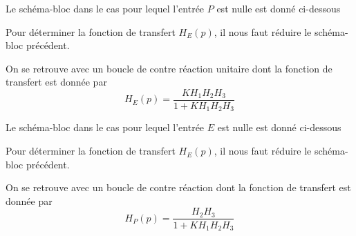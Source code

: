 
\question{}
Le schéma-bloc dans le cas pour lequel l'entrée $P$ est nulle est donné 
ci-dessous
\begin{center}
    
\end{center}

\question{}
Pour déterminer la fonction de transfert $H_E(p)$, il nous faut réduire le
schéma-bloc précédent.
\begin{center}
    
\end{center}
On se retrouve avec un boucle de contre réaction unitaire dont la fonction
de transfert est donnée par 
\[
    H_E(p)=\dfrac{KH_1H_2H_3}{1+KH_1H_2H_3}
\]

\question{}
Le schéma-bloc dans le cas pour lequel l'entrée $E$ est nulle est donné 
ci-dessous
\begin{center}
    
\end{center}

\question{}
Pour déterminer la fonction de transfert $H_E(p)$, il nous faut réduire le
schéma-bloc précédent.
\begin{center}
    
\end{center}
On se retrouve avec un boucle de contre réaction dont la fonction
de transfert est donnée par 
\[
    H_P(p)=\dfrac{H_2H_3}{1+KH_1H_2H_3}
\]

